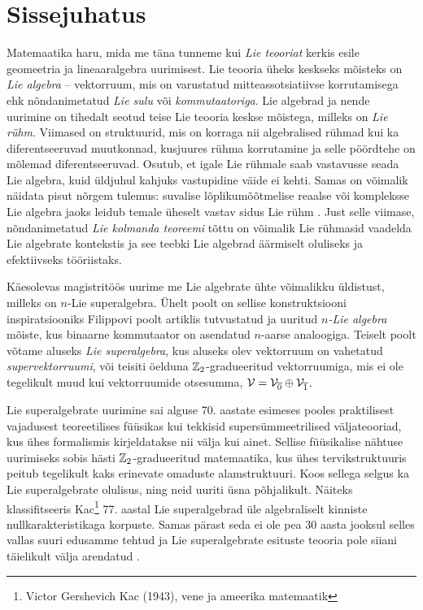 
\section*{Sissejuhatus}

Matemaatika haru, mida me täna tunneme kui \emph{Lie teooriat} kerkis esile
geomeetria ja lineaaralgebra uurimisest. Lie teooria üheks keskseks mõisteks
on \emph{Lie algebra} -- vektorruum, mis on varustatud
mitteassotsiatiivse korrutamisega ehk nõndanimetatud \emph{Lie sulu} või
\emph{kommutaatoriga}.
Lie algebrad ja nende uurimine on tihedalt seotud teise Lie teooria keskse
mõistega, milleks on \emph{Lie rühm}. Viimased on
struktuurid, mis on korraga nii algebralised rühmad kui ka diferentseeruvad
muutkonnad, kusjuures rühma korrutamine ja selle pöördtehe on mõlemad
diferentseeruvad. Osutub, et igale Lie rühmale saab vastavusse seada Lie
algebra, kuid üldjuhul kahjuks vastupidine väide ei kehti. Samas on võimalik
näidata pisut nõrgem tulemus: suvalise lõplikumõõtmelise
reaalse või kompleksse Lie algebra jaoks leidub temale üheselt
vastav sidus Lie rühm \cite{kirillov2008introduction}. Just selle viimase,
nõndanimetatud \emph{Lie kolmanda teoreemi} tõttu on võimalik
Lie rühmasid vaadelda Lie algebrate kontekstis ja see teebki Lie algebrad
äärmiselt oluliseks ja efektiivseks tööriistaks.

Käesolevas magistritöös uurime me Lie algebrate ühte võimalikku üldistust,
milleks on $n$-Lie superalgebra. Ühelt poolt on sellise konstruktsiooni
inspiratsiooniks Filippovi poolt artiklis \cite{filippov1985} tutvustatud ja
uuritud \emph{$n$-Lie algebra} mõiste, kus binaarne kommutaator on asendatud
$n$-aarse analoogiga. Teiselt poolt võtame aluseks \emph{Lie superalgebra},
kus aluseks olev vektorruum on vahetatud \emph{supervektorruumi}, või
teisiti öelduna $\mathbb{Z}_2$-gradueeritud vektorruumiga, mis ei ole tegelikult
muud kui vektorruumide otsesumma,
$\mathcal{V} = \mathcal{V}_{\overline{0}} \oplus \mathcal{V}_{\overline{1}}$.

Lie superalgebrate uurimine sai alguse 70. aastate esimeses pooles praktilisest
vajadusest teoreetilises füüsikas kui tekkisid supersümmeetrilised
väljateooriad, kus ühes formalismis kirjeldatakse nii välja kui ainet.
Sellise füüsikalise nähtuse uurimiseks sobis hästi $\mathbb{Z}_2$-gradueeritud
matemaatika, kus ühes tervikstruktuuris peitub tegelikult kaks erinevate
omaduste alamstruktuuri. \cite{abramov1994} Koos sellega selgus ka Lie
superalgebrate olulisus, ning neid uuriti üsna põhjalikult. Näiteks
klassifitseeris Kac\footnote{Victor Gershevich Kac (1943), vene ja ameerika
matemaatik} 77. aastal Lie superalgebrad üle algebraliselt kinniste
nullkarakteristikaga korpuste. Samas pärast seda ei ole pea 30 aasta jooksul
selles vallas suuri edusamme tehtud ja Lie superalgebrate esituste teooria
pole siiani täielikult välja arendatud \cite{musson2012lie}.

